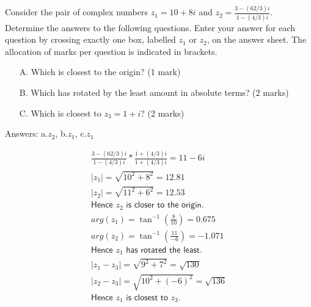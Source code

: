 \documentclass{uob-cs-exam}
\begin{document}
\begin{questions}
\question[5]
Consider the pair of complex numbers $z_1=10+8i$ and $z_2=\frac{3-(62/3)i}{1-(4/3)i}$.  Determine the answers to the following questions. Enter your answer for each question by crossing exactly one box, labelled $z_1$ or $z_2$, on the answer sheet. The allocation of marks per question is indicated in brackets.
\begin{itemize}
\item[A.] Which is closest to the origin? (1 mark)
\item[B.] Which has rotated by the least amount in absolute terms? (2 marks)
\item[C.] Which is closest to $z_3 = 1+i$? (2 marks)
\end{itemize}

\droppoints

\begin{solution}
Answers: a.$z_2$, b.$z_1$, c.$z_1$ 

\begin{align*}
  \frac{3-(62/3)i}{1-(4/3)i} * \frac{1+(4/3)i}{1+(4/3)i} = 11-6i\\
  |z_1|=\sqrt{10^2 + 8^2}=12.81\\
  |z_2|=\sqrt{11^2 + 6^2}=12.53\\
  \textsf{Hence } z_2 \textsf{ is closer to the origin.}\\
  arg(z_1) = \tan^{-1} \left(\frac{8}{10}\right) = 0.675\\
  arg(z_2) = \tan^{-1} \left(\frac{11}{-6}\right) = -1.071\\
  \textsf{Hence } z_1 \textsf{ has rotated the least.}\\
  |z_1 - z_3|=\sqrt{9^2+7^2}=\sqrt{130}\\
  |z_2 - z_3|=\sqrt{10^2+(-6)^2}=\sqrt{136}\\
  \textsf{Hence } z_1 \textsf{ is closest to } z_3.\\
\end{align*}

\end{solution}


\end{questions}
\end{document}
